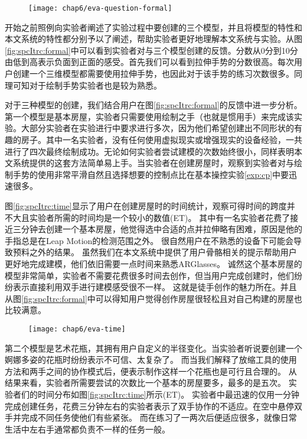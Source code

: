 \begin{figure}[!htp]
  \centering
  \texttt{[image: chap6/eva-question-formal]}
\end{figure}

开始之前照例向实验者阐述了实验过程中要创建的三个模型，并且将模型的特性和本文系统的特性都分别予以了阐述，帮助实验者更好地理解本文系统与实验。从图\ref{fig:spcItrc:formal}中可以看到实验者对与三个模型创建的反馈。分数从0分到10分由低到高表示负面到正面的感受。首先我们可以看到拉伸手势的分数很高。每次用户创建一个三维模型都需要使用拉伸手势，也因此对于该手势的练习次数很多。同理可知对于绘制手势实验者也是较为熟悉。

对于三种模型的创建，我们结合用户在图\ref{fig:spcItrc:formal}的反馈中进一步分析。第一个模型是基本房屋，实验者只需要使用绘制之手（也就是惯用手）来完成该实验。大部分实验者在实验进行中要求进行多次，因为他们希望创建出不同形状的有趣的房子。其中一名实验者，没有任何使用虚拟现实或增强现实的设备经验，一共进行了四次最终绘制成功。无论如何实验者尝试建模的次数始终很小，同样表明本文系统提供的这套方法简单易上手。当实验者在创建房屋时，观察到实验者对与绘制手势的使用非常平滑自然且选择想要的控制点比在基本操控实验\ref{exp:cp}中要迅速很多。

图\ref{fig:spcItrc:time}显示了用户在创建房屋时的时间统计，观察可得时间的跨度并不大且实验者所需的时间均是一个较小的数值(ET)。
其中有一名实验者花费了接近三分钟去创建一个基本房屋，他觉得选中合适的点并拉伸略有困难，原因是他的手指总是在Leap Motion的检测范围之外。
很自然用户在不熟悉的设备下可能会导致预料之外的结果。
虽然我们在本文系统中提供了用户骨骼相关的提示帮助用户更好地完成建模，他们依旧需要一点时间来熟悉ARGlasses。
诚然这个基本房屋的模型非常简单，实验者不需要花费很多时间去创作，但当用户完成创建时，他们纷纷表示直接利用双手进行建模感受很不一样。
这就是徒手创作的魅力所在。并且从图\ref{fig:spcItrc:formal}中可以得知用户觉得创作房屋很轻松且对自己构建的房屋也比较满意。

\begin{figure}[!htp]
  \centering
  \texttt{[image: chap6/eva-time]}
\end{figure}

第二个模型是艺术花瓶，其拥有用户自定义的半径变化。当实验者听说要创建一个婀娜多姿的花瓶时纷纷表示不可信、太复杂了。
而当我们解释了放缩工具的使用方法和两手之间的协作模式后，便表示制作这样一个花瓶也是可行且合理的。
从结果来看，实验者所需要尝试的次数比一个基本的房屋要多，最多的是五次。
实验者们的时间分布如图\ref{fig:spcItrc:time}所示(ET)。
实验者中最迅速的仅用一分钟完成创建任务，花费三分钟左右的实验者表示了双手协作的不适应。在空中悬停双手并完成不同任务使他们有些紧张。
而在练习了一两次后便适应很多，就像日常生活中左右手通常都负责不一样的任务一般。

